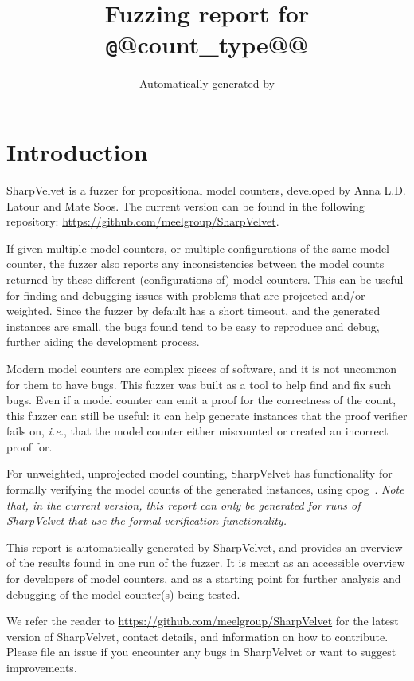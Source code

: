 \documentclass[british]{article}
\title{Fuzzing report for {\texttt @@count_type@@} }
\author{Automatically generated by \sharpvelvet{}}
\newcommand{\sharpvelvet}{{\sf SharpVelvet}}
\newcommand{\cpog}{{\sf cpog}}
\begin{document}
\maketitle %

\section{Introduction}
\label{sec:introduction}

\sharpvelvet{} is a fuzzer for propositional model counters, developed by Anna L.D. Latour and Mate Soos.
The current version can be found in the following repository: \url{https://github.com/meelgroup/SharpVelvet}.

If given multiple model counters, or multiple configurations of the same model counter, the fuzzer also reports any inconsistencies between the model
counts returned by these different (configurations of) model counters. 
This can be useful for finding and debugging issues with problems that are projected and/or weighted.
Since the fuzzer by default has a short timeout, and the generated instances are small, the bugs found tend to be easy to reproduce and debug, further aiding the development process.

Modern model counters are complex pieces of software, and it is not uncommon
for them to have bugs. 
This fuzzer was built as a tool to help find and fix such bugs. 
Even if a model counter can emit a proof for the correctness of the count, this fuzzer can still be useful: it can help generate instances that the proof verifier fails on, {\it i.e.}, that the model counter either
miscounted or created an incorrect proof for.

For unweighted, unprojected model counting, \sharpvelvet{} has functionality for formally verifying the model counts of the generated instances, using \cpog{}~\cite{BNAH2023}. {\em Note that, in the current version, this report can only be generated for runs of \sharpvelvet{} that use the formal verification functionality.} 

This report is automatically generated by \sharpvelvet{}, and provides an overview of the results found in one run of the fuzzer.
It is meant as an accessible overview for developers of model counters, and as a starting point for further analysis and debugging of the model counter(s) being tested.

We refer the reader to \url{https://github.com/meelgroup/SharpVelvet} for the latest version of \sharpvelvet{}, contact details, and information on how to contribute. Please file an issue if you encounter any bugs in \sharpvelvet{} or want to suggest improvements.
\end{document}
